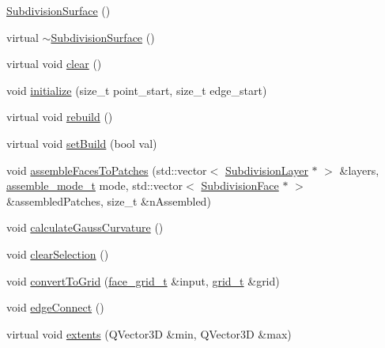 \begin{DoxyCompactItemize}
\item 
\hyperlink{classShipCAD_1_1SubdivisionSurface_a507ea9cd5354e1d14fe24d52da505934}{Subdivision\-Surface} ()
\item 
virtual \hyperlink{classShipCAD_1_1SubdivisionSurface_a4f1b66a4d9e9f8ac3dbd956e2113a594}{$\sim$\-Subdivision\-Surface} ()
\item 
virtual void \hyperlink{classShipCAD_1_1SubdivisionSurface_a80ab3bd6372a8465d69f71034a353e06}{clear} ()
\item 
void \hyperlink{classShipCAD_1_1SubdivisionSurface_a13cfd2714344c9b85aad8d123538db48}{initialize} (size\-\_\-t point\-\_\-start, size\-\_\-t edge\-\_\-start)
\item 
virtual void \hyperlink{classShipCAD_1_1SubdivisionSurface_a259856fc21f2bc1eebbc52f10dd59469}{rebuild} ()
\item 
virtual void \hyperlink{classShipCAD_1_1SubdivisionSurface_aec5073750762d1f8c3ab2107a742f4a5}{set\-Build} (bool val)
\item 
void \hyperlink{classShipCAD_1_1SubdivisionSurface_ad140279118fab3343a6aee5e544814ec}{assemble\-Faces\-To\-Patches} (std\-::vector$<$ \hyperlink{classShipCAD_1_1SubdivisionLayer}{Subdivision\-Layer} $\ast$ $>$ \&layers, \hyperlink{namespaceShipCAD_aaba70dc1c80dc540bef320cb9b720a20}{assemble\-\_\-mode\-\_\-t} mode, std\-::vector$<$ \hyperlink{classShipCAD_1_1SubdivisionFace}{Subdivision\-Face} $\ast$ $>$ \&assembled\-Patches, size\-\_\-t \&n\-Assembled)
\item 
void \hyperlink{classShipCAD_1_1SubdivisionSurface_a3aa7c4fd1fa84170a59e6c0549573c92}{calculate\-Gauss\-Curvature} ()
\item 
void \hyperlink{classShipCAD_1_1SubdivisionSurface_a2a984cc9ae8c78153113552cfb6321d5}{clear\-Selection} ()
\item 
void \hyperlink{classShipCAD_1_1SubdivisionSurface_a1deabf43f6a24c34a58889d0361b0959}{convert\-To\-Grid} (\hyperlink{classShipCAD_1_1SubdivisionSurface_a26a7d7b71acd662b1014ab39af4ee343}{face\-\_\-grid\-\_\-t} \&input, \hyperlink{classShipCAD_1_1SubdivisionSurface_a69d4a3ca038ee247d0abcffa6125df95}{grid\-\_\-t} \&grid)
\item 
void \hyperlink{classShipCAD_1_1SubdivisionSurface_aa0460120d8a093682ca352a47affdb87}{edge\-Connect} ()
\item 
virtual void \hyperlink{classShipCAD_1_1SubdivisionSurface_abc1cf0168290242dfbe5dd0d178fa7cb}{extents} (Q\-Vector3\-D \&min, Q\-Vector3\-D \&max)
\item 

\end{DoxyCompactItemize}

